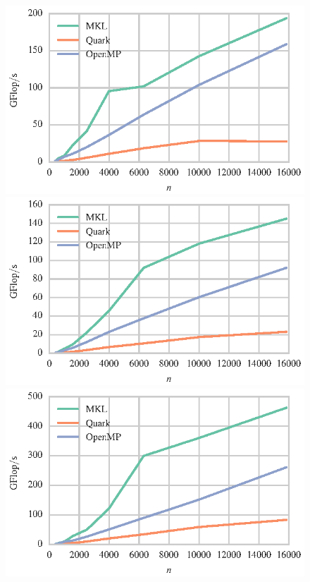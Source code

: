 \documentclass[a4paper,12pt]{article}
\begin{document}
\begin{figure}[t]
  \centering
  \includegraphics[scale=.85]{fig/knl_ram_zhetrf_weak_scaling.eps}
  \includegraphics[scale=.85]{fig/knl_ram_dsytrf_weak_scaling.eps}
  \includegraphics[scale=.85]{fig/knl_ram_chetrf_weak_scaling.eps}

\end{figure}
\end{document}
